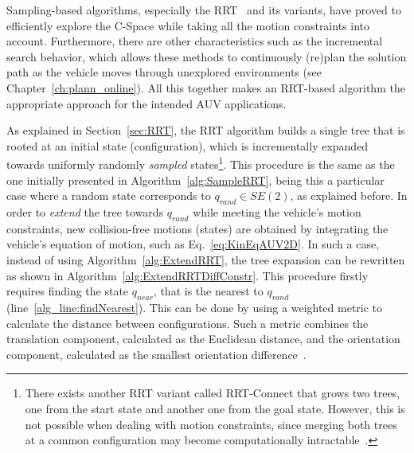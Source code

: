 Sampling-based algorithms, especially the \ac{RRT}~\cite{LaValle2001} and its
variants, have proved to efficiently explore the \ac{C-Space} while taking all
the motion constraints into account. Furthermore, there are other
characteristics such as the incremental search behavior, which allows these
methods to continuously (re)plan the solution path as the vehicle moves through
unexplored environments (see Chapter~\ref{ch:plann_online}). All this together
makes an \ac{RRT}-based algorithm the appropriate approach for the intended
\ac{AUV} applications.

As explained in Section~\ref{sec:RRT}, the \ac{RRT} algorithm builds a single
tree that is rooted at an initial state (configuration), which is incrementally
expanded towards uniformly randomly \textit{sampled} states\footnote{There
exists another RRT variant called RRT-Connect that grows two trees, one from the
start state and another one from the goal state. However, this is not possible
when dealing with motion constraints, since merging both trees at a common
configuration may become computationally intractable~\cite{Kuffner2000}.}. This
procedure is the same as the one initially presented in
Algorithm~\ref{alg:SampleRRT}, being this a particular case where a random state
corresponds to $q_{rand}\in SE(2)$, as explained before. In order to
\textit{extend} the tree towards $q_{rand}$ while meeting the vehicle's motion
constraints, new collision-free motions (states) are obtained by integrating the
vehicle's equation of motion, such as Eq.~\eqref{eq:KinEqAUV2D}. In such a case,
instead of using Algorithm~\ref{alg:ExtendRRT}, the tree expansion can be
rewritten as shown in Algorithm~\ref{alg:ExtendRRTDiffConstr}. This procedure
firstly requires finding the state $q_{near}$, that is the nearest to $q_{rand}$
(line~\ref{alg_line:findNearest}). This can be done by using a weighted metric
to calculate the distance between configurations. Such a metric combines the
translation component, calculated as the Euclidean distance, and the orientation
component, calculated as the smallest orientation
difference~\cite{Choset2005,LaValle2006}.

